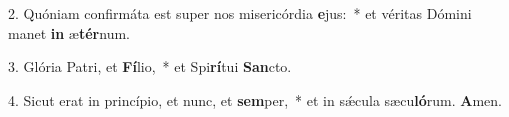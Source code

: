 \item 2. Quóniam confirmáta est super nos misericórdia \textbf{e}jus:~* et véritas Dómini manet \textbf{in} æ\textbf{tér}num.
\item 3. Glória Patri, et \textbf{Fí}lio,~* et Spi\textbf{rí}tui \textbf{San}cto.
\item 4. Sicut erat in princípio, et nunc, et \textbf{sem}per,~* et in sǽcula sæcu\textbf{ló}rum. \textbf{A}men.